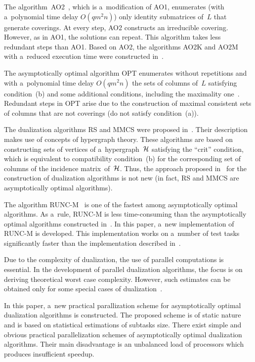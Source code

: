 \begin{multicols}{2}
The algorithm~AO2~\cite{D2004}, which is a~modification of AO1,
enumerates (with a~polynomial time delay $O(qm^2n)$) only identity
submatrices of~$L$ that generate coverings. At every step, AO2
constructs an irreducible covering. However, as in AO1, the
solutions can repeat. This algorithm takes less redundant steps
than AO1. Based on AO2, the algorithms AO2K and AO2M with 
a~reduced execution time were constructed in~\cite{DP2014}.

The asymptotically optimal algorithm OPT enumerates without
repetitions and
with a~polynomial time delay $O(qm^2n)$  the sets of columns of~$L$
satisfying condition~(b) and some additional conditions, including the maximality 
one~\cite{DI2008}. Redundant steps in OPT arise
due to the construction of maximal consistent sets of columns that
are not coverings (do not satisfy condition~(a)).


The dualization algorithms RS and MMCS were proposed 
in~\cite{MU2011, MU2014}. Their description makes use of concepts of
hypergraph theory. These algorithms are based on constructing sets
of vertices of a~hypergraph~$\mathcal{H}$ satisfying the ``crit''
condition, which is equivalent to compatibility condition~(b) for
the corresponding set of columns of the incidence matrix~of~$\mathcal{H}$.
Thus, the approach proposed in~\cite{MU2011, MU2014} for the
construction of dualization algorithms is not new (in fact, RS and
\mbox{MMCS} are asymptotically optimal algorithms).

The algorithm RUNC-M~\cite{DP2015} is one of the fastest among
asymptotically optimal algorithms. As a~rule, RUNC-M is less
time-consuming than the asymptotically optimal algorithms
constructed 
in~\cite{D1977, D1987, DZ1997, DZ2000, D2003,D2004, DI2008, DP2014, MU2011, MU2014}. 
In this paper, a~new
implementation of RUNC-M is developed. This implementation works
on a~number of test tasks significantly faster than the
implementation described in~\cite{DP2015}.

Due to the complexity of dualization, the use of parallel
computations is essential. In the development of parallel
dualization algorithms, the focus is on deriving theoretical worst
case complexity. However, such estimates can be obtained only for
some special cases of dualization~\cite{KBGE2007}.

In this paper, a~new practical parallization scheme for
asymptotically optimal dualization algorithms is constructed. The
proposed scheme is of static nature and is based on statistical
estimations of subtasks size. There exist simple and obvious
practical parallelization schemes of asymptotically optimal
dualization algorithms. Their main disadvantage is an unbalanced
load of processors which produces insufficient speedup.
{

}
\end{multicols}
